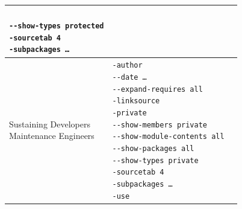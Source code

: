 \begin{longtable}{|l|l|X|}
{  \\ \texttt{-{}-show-types protected}
  \\ \texttt{-sourcetab 4}
  \\ \texttt{-subpackages …}
  } \\
\hline
  \makecell[l]{Sustaining Developers \\
  Maintenance Engineers}
  & \makecell[l]{\texttt{-author}
  \\ \texttt{-{}-date …}
  \\ \texttt{-{}-expand-requires all}
  \\ \texttt{-linksource}
  \\ \texttt{-private} 
  \\ \texttt{-{}-show-members private}
  \\ \texttt{-{}-show-module-contents all}
  \\ \texttt{-{}-show-packages all}
  \\ \texttt{-{}-show-types private}
  \\ \texttt{-sourcetab 4}
  \\ \texttt{-subpackages …}
  \\ \texttt{-use}
  } \\
\hline


\end{longtable}

